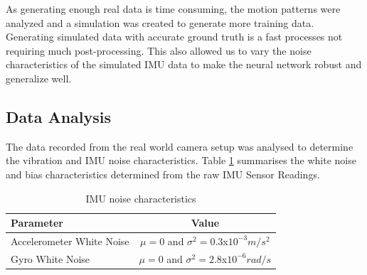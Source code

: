 As generating enough real data is time consuming, the motion patterns were analyzed and a simulation was created to generate more training data. Generating simulated data with accurate ground truth is a fast processes not requiring much post-processing. This also allowed us to vary the noise characteristics of the simulated IMU data to make the neural network robust and generalize well.

\subsection{Data Analysis}
\label{sec:data_analysis}
The data recorded from the real world camera setup was analysed to determine the vibration and IMU noise characteristics. Table \ref{tab:imu_noise_characteristics} summarises the white noise and bias characteristics determined from the raw IMU Sensor Readings. 


\begin{table}[H]
\centering
\begin{tabular}{l|c}
    \textbf{Parameter} & \textbf{Value} \\ \hline
    Accelerometer White Noise & $ \mu = 0 $ and $ \sigma^{2}=0.3$x$10^{-3} m/s^{2}$  \\  
    Gyro White Noise & $ \mu = 0 $ and $ \sigma^{2}=2.8$x$10^{-6} rad/s$ \\  
\end{tabular}
\caption{IMU noise characteristics}
\label{tab:imu_noise_characteristics}
\end{table}



